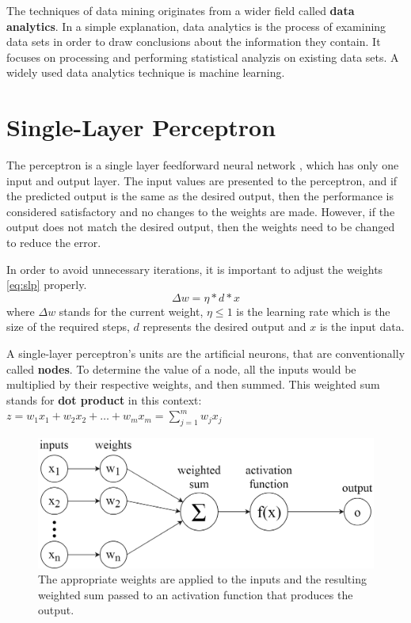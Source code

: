 The techniques of data mining originates from a wider field called \textbf{data analytics}. In a simple explanation, data analytics is the process of examining data sets in order to draw conclusions about the information they contain. It focuses on processing and performing statistical analyzis on existing data sets. A widely used data analytics technique is machine learning.



\section{Single-Layer Perceptron}

The perceptron is a single layer feedforward neural network \cite{tho2010perceptron}, which has only one input and output layer. The input values are presented to the perceptron, and if the predicted output is the same as the desired output, then the performance is considered satisfactory and no changes to the weights are made. However, if the output does not match the desired output, then the weights need to be changed to reduce the error. \medskip

In order to avoid unnecessary iterations, it is important to adjust the weights \eqref{eq:slp} properly.
\begin{equation} \Delta w = \eta * d * x \label{eq:slp} \end{equation} 
where $\Delta w$ stands for the current weight, $\eta \leq 1$ is the learning rate which is the size of the required steps, $d$ represents the desired output and $x$ is the input data.\medskip

A single-layer perceptron's units are the artificial neurons, that are conventionally called \textbf{nodes}. To determine the value of a node, all the inputs would be multiplied by their respective weights, and then summed. This weighted sum stands for \textbf{dot product} in this context: $ z = w_1 x_1 + w_2 x_2 + \dots + w_m x_m = \sum_{j=1}^m w_j x_j $

\begin{figure}[h]
	\centering
	\includegraphics[height=0.28\linewidth]{./figures/perceptron}
	\caption{The appropriate weights are applied to the inputs and the resulting weighted sum passed to an activation function that produces the output.}
	\label{fig:perceptron}
\end{figure}

